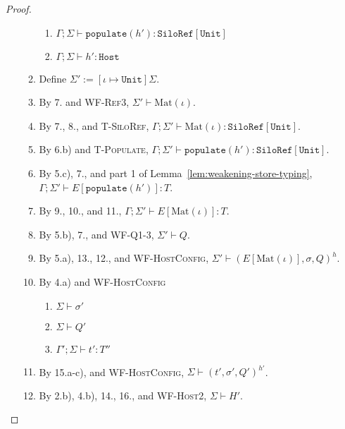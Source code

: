 \documentclass{article}
\theoremstyle{definition}
\begin{document}
\begin{proof}
\begin{itemize}
\begin{enumerate}
  \begin{enumerate}[label=(\alph*)]
  \item $\Gamma ; \Sigma \vdash \texttt{populate}(h') : \texttt{SiloRef}[\texttt{Unit}]$
  \item $\Gamma ; \Sigma \vdash h' : \texttt{Host}$
  \end{enumerate}
\item Define $\Sigma' := [\iota \mapsto \texttt{Unit}]\Sigma$.
\item By 7. and \textsc{WF-Ref3}, $\Sigma' \vdash \text{Mat}(\iota)$.
\item By 7., 8., and \textsc{T-SiloRef}, $\Gamma ; \Sigma' \vdash \text{Mat}(\iota) : \texttt{SiloRef}[\texttt{Unit}]$.
\item By 6.b) and \textsc{T-Populate}, $\Gamma ; \Sigma' \vdash \texttt{populate}(h') : \texttt{SiloRef}[\texttt{Unit}]$.
\item By 5.c), 7., and part 1 of Lemma~\ref{lem:weakening-store-typing}, $\Gamma ; \Sigma' \vdash E[\texttt{populate}(h')] : T$.
\item By 9., 10., and 11., $\Gamma ; \Sigma' \vdash E[\text{Mat}(\iota)] : T$.
\item By 5.b), 7., and \textsc{WF-Q1-3}, $\Sigma' \vdash Q$.
\item By 5.a), 13., 12., and \textsc{WF-HostConfig}, $\Sigma' \vdash (E[\text{Mat}(\iota)], \sigma, Q)^h$.
\item By 4.a) and \textsc{WF-HostConfig}
  \begin{enumerate}[label=(\alph*)]
  \item $\Sigma \vdash \sigma'$
  \item $\Sigma \vdash Q'$
  \item $\Gamma' ; \Sigma \vdash t' : T''$
  \end{enumerate}
\item By 15.a-c), and \textsc{WF-HostConfig}, $\Sigma \vdash (t', \sigma', Q')^{h'}$.
\item By 2.b), 4.b), 14., 16., and \textsc{WF-Host2}, $\Sigma \vdash H'$.
\end{enumerate}


\end{itemize}
\end{proof}
\end{document}
